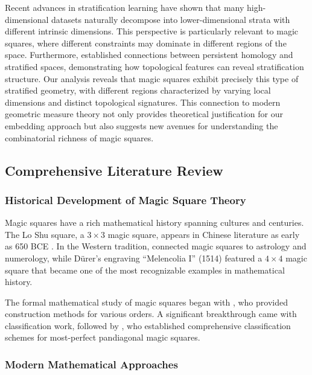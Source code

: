 Recent advances in stratification learning \citep{chen2022} have shown that many high-dimensional datasets naturally decompose into lower-dimensional strata with different intrinsic dimensions. This perspective is particularly relevant to magic squares, where different constraints may dominate in different regions of the space. Furthermore, \citet{chen2023} established connections between persistent homology and stratified spaces, demonstrating how topological features can reveal stratification structure. Our analysis reveals that magic squares exhibit precisely this type of stratified geometry, with different regions characterized by varying local dimensions and distinct topological signatures. This connection to modern geometric measure theory not only provides theoretical justification for our embedding approach but also suggests new avenues for understanding the combinatorial richness of magic squares.

\subsection{Comprehensive Literature Review}

\subsubsection{Historical Development of Magic Square Theory}

Magic squares have a rich mathematical history spanning cultures and centuries. The Lo Shu square, a $3 \times 3$ magic square, appears in Chinese literature as early as 650 BCE \citep{cammann1960}. In the Western tradition, \citet{agrippa1533occulta} connected magic squares to astrology and numerology, while Dürer's engraving ``Melencolia I'' (1514) featured a $4 \times 4$ magic square that became one of the most recognizable examples in mathematical history.

The formal mathematical study of magic squares began with \citet{euler1782}, who provided construction methods for various orders. A significant breakthrough came with \citet{macmahon1921} classification work, followed by \citet{ollerenshaw1998}, who established comprehensive classification schemes for most-perfect pandiagonal magic squares.

\subsubsection{Modern Mathematical Approaches}

